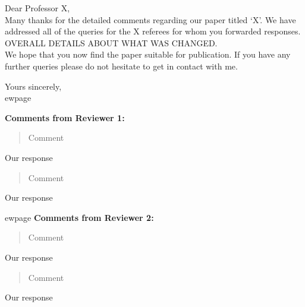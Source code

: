 \documentclass{article}
\begin{document}
Dear Professor  X,\\

Many thanks for the detailed comments regarding our paper titled `X'. We have addressed all of the queries for the X referees for whom you forwarded responses. OVERALL DETAILS ABOUT WHAT WAS CHANGED. \\

We hope that you now find the paper suitable for publication. If you have any further queries please do not hesitate to get in contact with me.\\

\vspace{0.5cm}

Yours sincerely,\\


ewpage

\textbf{Comments from Reviewer 1:}
\begin{framed} \begin{quote}
Comment
\end{quote} \end{framed}
 
Our response

\begin{framed} \begin{quote}
Comment
\end{quote} \end{framed}
 
Our response


ewpage
\textbf{Comments from Reviewer 2:}
\begin{framed} \begin{quote}
Comment
\end{quote} \end{framed}
 
Our response

\begin{framed} \begin{quote}
Comment
\end{quote} \end{framed}
 
Our response
\end{document}

